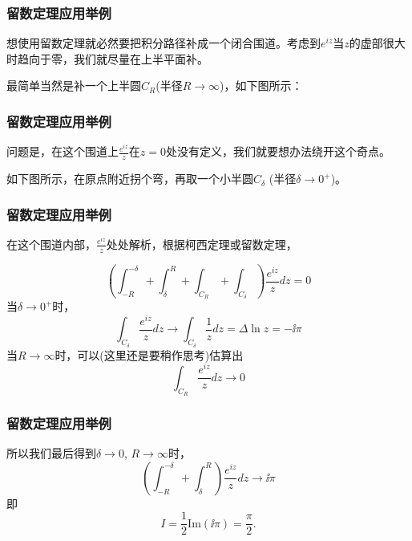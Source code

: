 \documentclass[CJK]{beamer}
\begin{document}
\begin{frame}
  \frametitle{留数定理应用举例}
  
  想使用留数定理就必然要把积分路径补成一个闭合围道。考虑到$e^{iz}$当$z$的虚部很大时趋向于零，我们就尽量在上半平面补。

  最简单当然是补一个上半圆$C_R$(半径$R\rightarrow \infty$)，如下图所示：
  

  
  
  
\end{frame}

\begin{frame}
  \frametitle{留数定理应用举例}
  
  问题是，在这个围道上$\frac{e^{iz}}{z}$在$z=0$处没有定义，我们就要想办法绕开这个奇点。

  如下图所示，在原点附近拐个弯，再取一个小半圆$C_\delta$ (半径$\delta \rightarrow 0^+$)。
  

  
\end{frame}


\begin{frame}
  \frametitle{留数定理应用举例}
  \emini
  在这个围道内部，$\frac{e^{iz}}{z}$处处解析，根据柯西定理或留数定理，
  \emini

  $$\left(\int_{-R}^{-\delta} + \int_{\delta}^{R} + \int_{C_R} + \int_{C_\delta}\right)\frac{e^{iz}}{z} dz = 0  $$
 当$\delta \rightarrow 0^+$时，
 $$\int_{C_\delta} \frac{e^{iz}}{z}dz  \rightarrow \int_{C_\delta} \frac{1}{z}dz = \Delta \ln z = - \ii \pi $$
 当$R\rightarrow \infty$时，可以(这里还是要稍作思考)估算出
 $$\int_{C_R} \frac{e^{iz}}{z}dz \rightarrow 0$$
  
\end{frame}

\begin{frame}
  \frametitle{留数定理应用举例}
    
    所以我们最后得到$\delta\rightarrow 0$, $R\rightarrow \infty$时，
    $$\left(\int_{-R}^{-\delta} + \int_{\delta}^{R}\right)  \frac{e^{iz}}{z} dz \rightarrow \ii\pi $$
    即
    $$ I = \frac{1}{2}\mathrm{Im}(\ii\pi) = \frac{\pi}{2}.$$
  
\end{frame}
\end{document}
